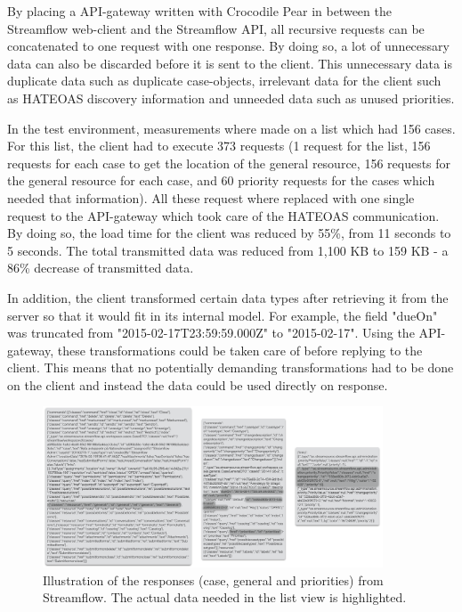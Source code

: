 \documentclass{cslthse-msc}
\begin{document}
By placing a API-gateway written with Crocodile Pear in between the Streamflow web-client and the Streamflow API, all recursive requests can be concatenated to one request with one response. By doing so, a lot of unnecessary data can also be discarded before it is sent to the client. This unnecessary data is duplicate data such as duplicate case-objects, irrelevant data for the client such as HATEOAS discovery information and unneeded data such as unused priorities.

In the test environment, measurements where made on a list which had 156 cases. For this list, the client had to execute 373 requests (1 request for the list, 156 requests for each case to get the location of the general resource, 156 requests for the general resource for each case, and 60 priority requests for the cases which needed that information). All these request where replaced with one single request to the API-gateway which took care of the HATEOAS communication. By doing so, the load time for the client was reduced by 55\%, from 11 seconds to 5 seconds. The total transmitted data was reduced from 1,100 KB to 159 KB - a 86\% decrease of transmitted data.

In addition, the client transformed certain data types after retrieving it from the server so that it would fit in its internal model. For example, the field "dueOn" was truncated from "2015-02-17T23:59:59.000Z" to "2015-02-17". Using the API-gateway, these transformations could be taken care of before replying to the client. This means that no potentially demanding transformations had to be done on the client and instead the data could be used directly on response.

\begin{figure}[H]
  \centering
    \begin{center}
      \includegraphics[width=0.9\textwidth]{images/streamflow_response.png}
    \end{center}
  \caption{Illustration of the responses (case, general and priorities) from Streamflow. The actual data needed in the list view is highlighted.}
\end{figure}
\end{document}
